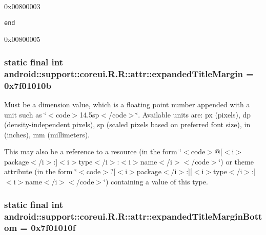 0x00800003

{\tt end}

0x00800005\hypertarget{classandroid_1_1support_1_1coreui_1_1_r_1_1attr_1e7ac95be5aa82becbffe0cd3758340b}{
\subsubsection[{expandedTitleMargin}]{\setlength{\rightskip}{0pt plus 5cm}static final int android::support::coreui.R.R::attr::expandedTitleMargin = 0x7f01010b}}
\label{classandroid_1_1support_1_1coreui_1_1_r_1_1attr_1e7ac95be5aa82becbffe0cd3758340b}


Must be a dimension value, which is a floating point number appended with a unit such as \char`\"{}$<$code$>$14.5sp$<$/code$>$\char`\"{}. Available units are: px (pixels), dp (density-independent pixels), sp (scaled pixels based on preferred font size), in (inches), mm (millimeters). 

This may also be a reference to a resource (in the form \char`\"{}$<$code$>$@\mbox{[}$<$i$>$package$<$/i$>$:\mbox{]}$<$i$>$type$<$/i$>$:$<$i$>$name$<$/i$>$$<$/code$>$\char`\"{}) or theme attribute (in the form \char`\"{}$<$code$>$?\mbox{[}$<$i$>$package$<$/i$>$:\mbox{]}\mbox{[}$<$i$>$type$<$/i$>$:\mbox{]}$<$i$>$name$<$/i$>$$<$/code$>$\char`\"{}) containing a value of this type. \hypertarget{classandroid_1_1support_1_1coreui_1_1_r_1_1attr_c47790cb466476d0fbd4ca620e6a620a}{
\subsubsection[{expandedTitleMarginBottom}]{\setlength{\rightskip}{0pt plus 5cm}static final int android::support::coreui.R.R::attr::expandedTitleMarginBottom = 0x7f01010f}}
\label{classandroid_1_1support_1_1coreui_1_1_r_1_1attr_c47790cb466476d0fbd4ca620e6a620a}


